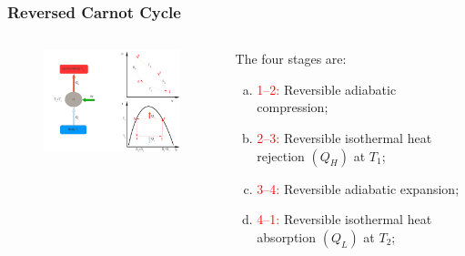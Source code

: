 \documentclass[10pt,compress,handout,ignorenonframetext]{beamer}
\begin{document}
\begin{frame}
 \frametitle{Reversed Carnot Cycle}
  \begin{columns}

   \begin{column}[c]{0.55\linewidth}
    \begin{figure}%
     \begin{center}
      \includegraphics[width=6.8cm,height=6.cm]{./Pics/Overview_Refrig4}
     \end{center}
    \end{figure}  
   \end{column}  


   \begin{column}[c]{0.45\linewidth}
    The four stages are:
    \begin{enumerate}[(a)]
     \item <1-> \textcolor{red}{1--2:} Reversible adiabatic compression;
     \item <2-> \textcolor{red}{2--3:} Reversible isothermal heat rejection $\left(Q_{H}\right)$ at $T_{1}$;
     \item <3-> \textcolor{red}{3--4:} Reversible adiabatic expansion;
     \item <4-> \textcolor{red}{4--1:} Reversible isothermal heat absorption $\left(Q_{L}\right)$ at $T_{2}$;
    \end{enumerate}
   \end{column}
  \end{columns}
\end{frame}
\end{document}
